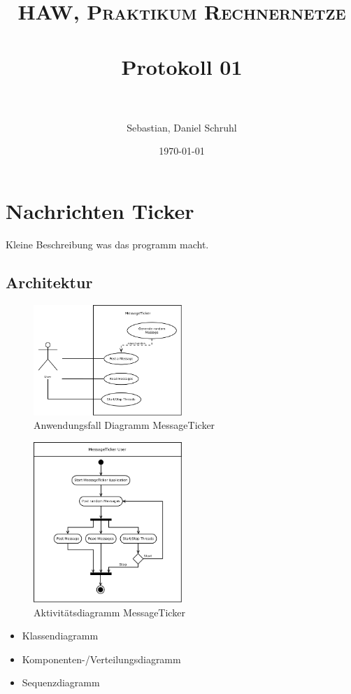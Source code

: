 \documentclass[paper=a4, fontsize=11pt]{scrreprt}
\title{	
	\normalfont \normalsize 
	\textsc{HAW, Praktikum Rechnernetze} \\ [25pt] 
	\horrule{0.5pt} \\[0.4cm]
	\huge Protokoll 01 \\
	\horrule{2pt} \\[0.5cm]
}
\author{Sebastian, Daniel Schruhl}
\date{\normalsize\today}
\numberwithin{equation}{section}
\numberwithin{figure}{section}
\numberwithin{table}{section}
\begin{document}
\maketitle

\section{Nachrichten Ticker}

Kleine Beschreibung was das programm macht.

\subsection{Architektur}

\begin{figure}[!htb] 
  \centering
     \includegraphics[width=0.5\textwidth]{resources/use-case.png}
  \caption{Anwendungsfall Diagramm MessageTicker}
  \label{fig:use-case}
\end{figure}

\begin{figure}[!htb] 
  \centering
     \includegraphics[width=0.5\textwidth]{resources/activity.png}
  \caption{Aktivitätsdiagramm MessageTicker}
  \label{fig:use-case}
\end{figure}

\begin{itemize}
    \item Klassendiagramm
    \item Komponenten-/Verteilungsdiagramm
    \item Sequenzdiagramm
\end{itemize} 
\end{document}
